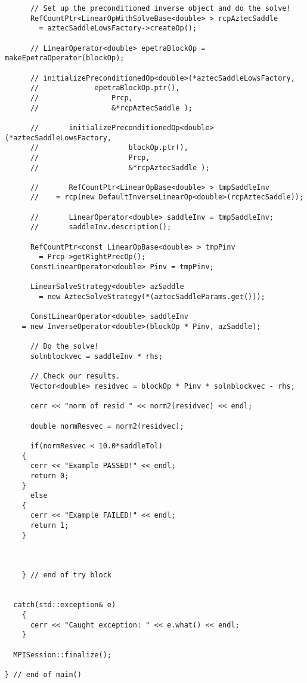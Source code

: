 \documentclass[oneeqnum,onefignum,onetabnum,10pt]{SANDreport}
\begin{document}
\begin{verbatim}
      // Set up the preconditioned inverse object and do the solve!
      RefCountPtr<LinearOpWithSolveBase<double> > rcpAztecSaddle 
        = aztecSaddleLowsFactory->createOp();

      // LinearOperator<double> epetraBlockOp = makeEpetraOperator(blockOp);

      // initializePreconditionedOp<double>(*aztecSaddleLowsFactory, 
      //			 epetraBlockOp.ptr(), 
      //				 Prcp,
      //				 &*rcpAztecSaddle );

      //       initializePreconditionedOp<double>(*aztecSaddleLowsFactory, 
      // 					 blockOp.ptr(), 
      // 					 Prcp,
      // 					 &*rcpAztecSaddle );
      
      //       RefCountPtr<LinearOpBase<double> > tmpSaddleInv 
      // 	= rcp(new DefaultInverseLinearOp<double>(rcpAztecSaddle));
      
      //       LinearOperator<double> saddleInv = tmpSaddleInv;
      //       saddleInv.description();

      RefCountPtr<const LinearOpBase<double> > tmpPinv 
        = Prcp->getRightPrecOp();
      ConstLinearOperator<double> Pinv = tmpPinv;

      LinearSolveStrategy<double> azSaddle 
        = new AztecSolveStrategy(*(aztecSaddleParams.get()));

      ConstLinearOperator<double> saddleInv 
	= new InverseOperator<double>(blockOp * Pinv, azSaddle);

      // Do the solve!
      solnblockvec = saddleInv * rhs;

      // Check our results.
      Vector<double> residvec = blockOp * Pinv * solnblockvec - rhs;

      cerr << "norm of resid " << norm2(residvec) << endl;
      
      double normResvec = norm2(residvec);

      if(normResvec < 10.0*saddleTol)
	{
	  cerr << "Example PASSED!" << endl;
	  return 0;
	}
      else
	{
	  cerr << "Example FAILED!" << endl;
	  return 1;
	}



    } // end of try block


  catch(std::exception& e)
    {
      cerr << "Caught exception: " << e.what() << endl;
    }

  MPISession::finalize();

} // end of main()


\end{verbatim}
\end{document}
